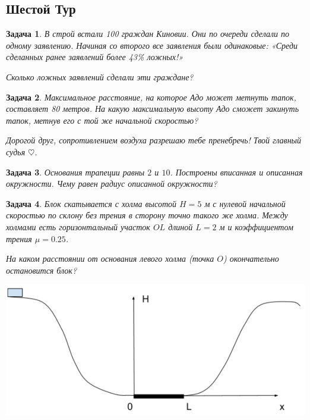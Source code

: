 \documentclass[a4paper, 11pt]{article}
\theoremstyle{break}
\newtheorem{problem}{Задача}[subsection]
\begin{document}
\subsection*{Шестой Тур}
\setcounter{problem}{0}


\begin{problem}
В строй встали 100 граждан Киновии. Они по очереди сделали по одному заявлению.
Начиная со второго все заявления были одинаковые: «Среди сделанных ранее заявлений более 43\% ложных!»

Сколько ложных заявлений сделали эти граждане?
\end{problem}

\begin{problem}
Максимальное расстояние, на которое Адо может метнуть тапок, составляет 80 метров.
На какую максимальную высоту Адо сможет закинуть тапок, метнув его с той же
начальной скоростью?

Дорогой друг, сопротивлением воздуха разрешаю тебе пренебречь! Твой главный судья $\heartsuit$.
\end{problem}


\begin{problem}
Основания трапеции равны $2$ и $10$. Построены вписанная и описанная окружности.
Чему равен радиус описанной окружности?
\end{problem}

\begin{problem}
Блок скатывается с холма высотой $H=5$ м с нулевой начальной скоростью по склону
без трения в сторону точно такого же холма. Между холмами есть горизонтальный участок
$OL$ длиной $L=2$ м и коэффициентом трения $\mu = 0.25$.

На каком расстоянии от основания левого холма (точка $O$) окончательно остановится блок?

\includegraphics[scale=0.3]{images/6tour_sliding_block.png}
\end{problem}
\end{document}
